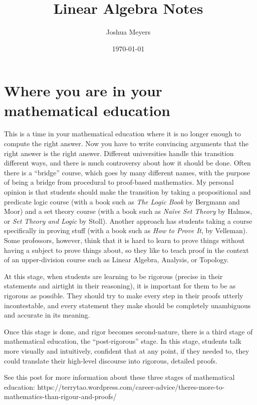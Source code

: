 \documentclass[12pt]{article}
\title{Linear Algebra Notes}
\author{Joshua Meyers}
\begin{document}
\date{\today}
\maketitle

\section{Where you are in your mathematical education}

This is a time in your mathematical education where it is no longer
enough to compute the right answer.  Now you have to write convincing
arguments that the right answer is the right answer.  Different
universities handle this transition different ways, and there is much
controversy about how it should be done.  Often there is a ``bridge''
course, which goes by many different names, with the purpose of being
a bridge from procedural to proof-based mathematics.  My personal
opinion is that students should make the transition by taking a
propositional and predicate logic course (with a book such as
\textit{The Logic Book} by Bergmann and Moor) and a set theory course
(with a book such as \textit{Na\"{i}ve Set Theory} by Halmos, or
\textit{Set Theory and Logic} by Stoll).  Another approach has
students taking a course specifically in proving stuff (with a book
such as \textit{How to Prove It}, by Velleman).  Some professors,
however, think that it is hard to learn to prove things without having
a subject to prove things about, so they like to teach proof in the
context of an upper-division course such as Linear Algebra, Analysis,
or Topology.

At this stage, when students are learning to be rigorous (precise in
their statements and airtight in their reasoning), it is important for
them to be as rigorous as possible.  They should try to make every
step in their proofs utterly incontestable, and every statement they
make should be completely unambiguous and accurate in its meaning.

Once this stage is done, and rigor becomes second-nature, there is a
third stage of mathematical education, the ``post-rigorous'' stage.
In this stage, students talk more visually and intuitively, confident
that at any point, if they needed to, they could translate their
high-level discourse into rigorous, detailed proofs.

See this post for more information about these three stages of
mathematical education:
https://terrytao.wordpress.com/career-advice/theres-more-to-mathematics-than-rigour-and-proofs/
\end{document}
